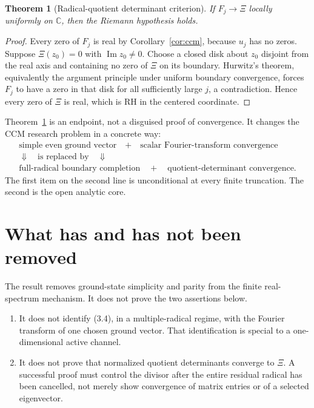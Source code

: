 \documentclass[11pt]{article}
\newtheorem{theorem}{Theorem}[section]
\numberwithin{equation}{section}
\theoremstyle{definition}
\theoremstyle{remark}
\newcommand{\C}{\mathbb C}
\begin{document}
\begin{theorem}[Radical-quotient determinant criterion]
\label{thm:rh}
If $F_j\to\Xi$ locally uniformly on $\C$, then the Riemann hypothesis holds.
\end{theorem}

\begin{proof}
Every zero of $F_j$ is real by Corollary~\ref{cor:ccm}, because $u_j$ has no zeros.  Suppose
$\Xi(z_0)=0$ with $\operatorname{Im}z_0\ne0$.  Choose a closed disk about $z_0$ disjoint from the
real axis and containing no zero of $\Xi$ on its boundary.  Hurwitz's theorem, equivalently the
argument principle under uniform boundary convergence, forces $F_j$ to have a zero in that disk
for all sufficiently large $j$, a contradiction.  Hence every zero of $\Xi$ is real, which is RH
in the centered coordinate.
\end{proof}

Theorem~\ref{thm:rh} is an endpoint, not a disguised proof of convergence.  It changes the CCM
research problem in a concrete way:
\[
\begin{array}{c}
\text{simple even ground vector}\quad+\quad
\text{scalar Fourier-transform convergence}
\\[2mm]
\Downarrow\quad\text{is replaced by}\quad\Downarrow
\\[2mm]
\text{full-radical boundary completion}\quad+\quad
\text{quotient-determinant convergence}.
\end{array}
\]
The first item on the second line is unconditional at every finite truncation.  The second is the
open analytic core.

\section{What has and has not been removed}

The result removes ground-state simplicity and parity from the finite real-spectrum mechanism.
It does not prove the two assertions below.

\begin{enumerate}
\item It does not identify (3.4), in a multiple-radical regime, with the Fourier transform of one
      chosen ground vector.  That identification is special to a one-dimensional active channel.
\item It does not prove that normalized quotient determinants converge to $\Xi$.  A successful
      proof must control the divisor after the entire residual radical has been cancelled, not
      merely show convergence of matrix entries or of a selected eigenvector.
\end{enumerate}
\end{document}
